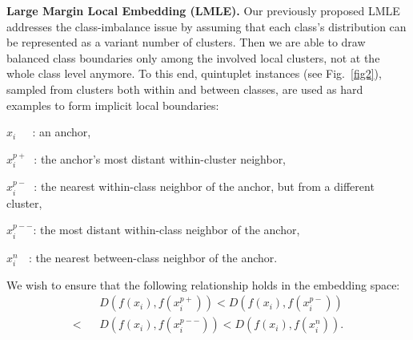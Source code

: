 \documentclass[10pt,journal,compsoc]{IEEEtran}
\newenvironment{packed_itemize}{
\vspace{-0.15cm}\begin{itemize}
  \setlength{\itemsep}{1pt}
  \setlength{\parskip}{0pt}
  \setlength{\parsep}{0pt}
}{\end{itemize}}
\begin{document}
\noindent
{\bf Large Margin Local Embedding (LMLE).} Our previously proposed LMLE~\cite{huang2016lmle} addresses the class-imbalance issue by assuming that each class's distribution can be represented as a variant number of clusters. Then we are able to draw balanced class boundaries only among the involved local clusters, not at the whole class level anymore. To this end, quintuplet instances (see Fig.~\ref{fig2}), sampled from clusters both within and between classes, are used as hard examples to form implicit local boundaries:

\small
\begin{packed_itemize}
\item $x_i\;\;\;\;\,\,$: an anchor,
\item $x_i^{p+}\;\,\,$: the anchor's most distant within-cluster neighbor,
\item $x_i^{p-}\;\,\,$:  the nearest within-class neighbor of the anchor, but from a different cluster,
\item $x_i^{p--}$: the most distant within-class neighbor of the anchor,
\item $x_i^{n}\;\,\,\,\,$: the nearest between-class neighbor of the anchor.
\end{packed_itemize}
\normalsize

We wish to ensure that the following relationship holds in the embedding space:
\begin{eqnarray}
\label{eq4}
   &&D(f(x_i),f(x_i^{p+}))<D(f(x_i),f(x_i^{p-}))\nonumber\\
< \!\!\!\!\!\!\!\!\!\! &&D(f(x_i),f(x_i^{p--}))<D(f(x_i),f(x_i^{n})).
\end{eqnarray}
\end{document}
